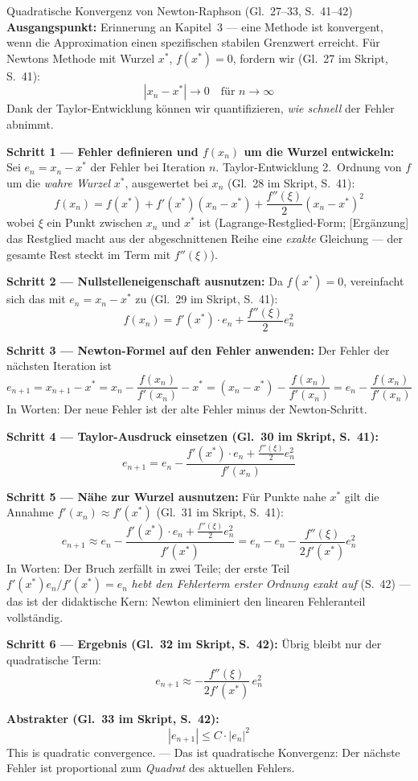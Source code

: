 \begin{satzbox}{Quadratische Konvergenz von Newton-Raphson (Gl.~27--33, S.~41--42)}
\textbf{Ausgangspunkt:} Erinnerung an Kapitel~3 — eine Methode ist konvergent, wenn die Approximation einen spezifischen stabilen Grenzwert erreicht. Für Newtons Methode mit Wurzel $x^*$, $f(x^*) = 0$, fordern wir (Gl.~27 im Skript, S.~41):
\[ |x_n - x^*| \to 0 \quad \text{für } n \to \infty \tag{Gl.~27} \]
Dank der Taylor-Entwicklung können wir quantifizieren, \emph{wie schnell} der Fehler abnimmt.

\textbf{Schritt 1 — Fehler definieren und $f(x_n)$ um die Wurzel entwickeln:} Sei $e_n = x_n - x^*$ der Fehler bei Iteration $n$. Taylor-Entwicklung 2.~Ordnung von $f$ um die \emph{wahre Wurzel} $x^*$, ausgewertet bei $x_n$ (Gl.~28 im Skript, S.~41):
\[ f(x_n) = f(x^*) + f'(x^*)(x_n - x^*) + \frac{f''(\xi)}{2}(x_n - x^*)^2 \tag{Gl.~28} \]
wobei $\xi$ ein Punkt zwischen $x_n$ und $x^*$ ist (Lagrange-Restglied-Form; [Ergänzung] das Restglied macht aus der abgeschnittenen Reihe eine \emph{exakte} Gleichung — der gesamte Rest steckt im Term mit $f''(\xi)$).

\textbf{Schritt 2 — Nullstelleneigenschaft ausnutzen:} Da $f(x^*) = 0$, vereinfacht sich das mit $e_n = x_n - x^*$ zu (Gl.~29 im Skript, S.~41):
\[ f(x_n) = f'(x^*)\cdot e_n + \frac{f''(\xi)}{2}e_n^2 \tag{Gl.~29} \]

\textbf{Schritt 3 — Newton-Formel auf den Fehler anwenden:} Der Fehler der nächsten Iteration ist
\[ e_{n+1} = x_{n+1} - x^* = x_n - \frac{f(x_n)}{f'(x_n)} - x^* = (x_n - x^*) - \frac{f(x_n)}{f'(x_n)} = e_n - \frac{f(x_n)}{f'(x_n)} \]
In Worten: Der neue Fehler ist der alte Fehler minus der Newton-Schritt.

\textbf{Schritt 4 — Taylor-Ausdruck einsetzen (Gl.~30 im Skript, S.~41):}
\[ e_{n+1} = e_n - \frac{f'(x^*)\cdot e_n + \frac{f''(\xi)}{2}e_n^2}{f'(x_n)} \tag{Gl.~30} \]

\textbf{Schritt 5 — Nähe zur Wurzel ausnutzen:} Für Punkte nahe $x^*$ gilt die Annahme $f'(x_n) \approx f'(x^*)$ (Gl.~31 im Skript, S.~41):
\[ e_{n+1} \approx e_n - \frac{f'(x^*)\cdot e_n + \frac{f''(\xi)}{2}e_n^2}{f'(x^*)} = e_n - e_n - \frac{f''(\xi)}{2 f'(x^*)}e_n^2 \tag{Gl.~31} \]
In Worten: Der Bruch zerfällt in zwei Teile; der erste Teil $f'(x^*)e_n / f'(x^*) = e_n$ \emph{hebt den Fehlerterm erster Ordnung exakt auf} (S.~42) — das ist der didaktische Kern: Newton eliminiert den linearen Fehleranteil vollständig.

\textbf{Schritt 6 — Ergebnis (Gl.~32 im Skript, S.~42):} Übrig bleibt nur der quadratische Term:
\[ e_{n+1} \approx -\frac{f''(\xi)}{2 f'(x^*)}\,e_n^2 \tag{Gl.~32} \]

\textbf{Abstrakter (Gl.~33 im Skript, S.~42):}
\[ |e_{n+1}| \leq C \cdot |e_n|^2 \tag{Gl.~33} \]
\glqq This is quadratic convergence.\grqq{} — Das ist quadratische Konvergenz: Der nächste Fehler ist proportional zum \emph{Quadrat} des aktuellen Fehlers.
\end{satzbox}

